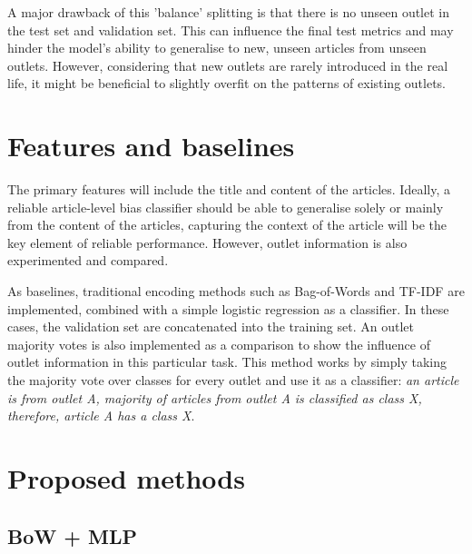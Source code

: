 A major drawback of this 'balance' splitting is that there is no unseen outlet in the test set and validation set. This can influence the final test metrics and may hinder the model's ability to generalise to new, unseen articles from unseen outlets. However, considering that new outlets are rarely introduced in the real life, it might be beneficial to slightly overfit on the patterns of existing outlets.


\section{Features and baselines}

The primary features will include the title and content of the articles. Ideally, a reliable article-level bias classifier should be able to generalise solely or mainly from the content of the articles, capturing the context of the article will be the key element of reliable performance. However, outlet information is also experimented and compared.

As baselines, traditional encoding methods such as Bag-of-Words and TF-IDF are implemented, combined with a simple logistic regression as a classifier. In these cases, the validation set are concatenated into the training set. An outlet majority votes is also implemented as a comparison to show the influence of outlet information in this particular task. This method works by simply taking the majority vote over classes for every outlet and use it as a classifier: \textit{an article is from outlet A, majority of articles from outlet A is classified as class X, therefore, article A has a class X}.

\section{Proposed methods}

\subsection{BoW + MLP}

